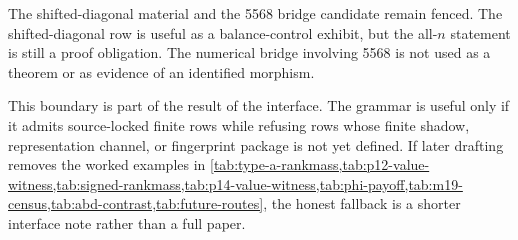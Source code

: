 The shifted-diagonal material and the 5568 bridge candidate remain fenced.  The shifted-diagonal row is useful as a balance-control exhibit, but the all-\(n\) statement is still a proof obligation.  The numerical bridge involving 5568 is not used as a theorem or as evidence of an identified morphism.

This boundary is part of the result of the interface.  The grammar is useful only if it admits source-locked finite rows while refusing rows whose finite shadow, representation channel, or fingerprint package is not yet defined.  If later drafting removes the worked examples in \cref{tab:type-a-rankmass,tab:p12-value-witness,tab:signed-rankmass,tab:p14-value-witness,tab:phi-payoff,tab:m19-census,tab:abd-contrast,tab:future-routes}, the honest fallback is a shorter interface note rather than a full paper.